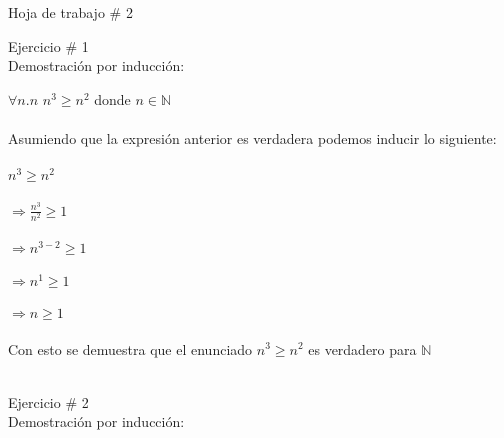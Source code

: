 \documentclass[]{article}
\begin{document}
\begin{center}
\Huge
Hoja de trabajo \# 2\\
\end{center}
\Large
Ejercicio \# 1\\
\normalsize
Demostración por inducción:\\
\begin{center}
$\forall n.n$ $n^3 \geq  n^2$ donde  $ n \in \mathbb{N}$\\~\\
Asumiendo que la expresión anterior es verdadera podemos inducir lo siguiente:\\~\\
$n^3 \geq  n^2$\\~\\
$\Longrightarrow \frac{n^3}{n^2} \geq  1$\\~\\
$\Longrightarrow n^{3-2} \geq 1$\\~\\
$\Longrightarrow n^1 \geq 1$\\~\\
$\Longrightarrow n \geq 1$\\~\\
Con esto se demuestra que el enunciado $n^3 \geq  n^2$ es verdadero para $\mathbb{N}$\\~\\
\end{center}
\Large
Ejercicio \# 2\\
\normalsize
Demostración por inducción:\\
\end{document}
